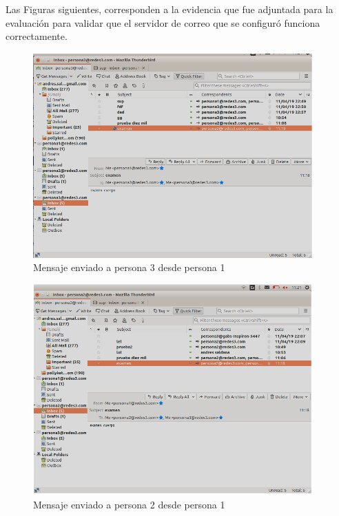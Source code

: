 \noindent
Las Figuras siguientes, corresponden a la evidencia que fue adjuntada para la evaluación para validar que el servidor de correo que se configuró funciona correctamente.

\begin{figure}[H]
    \centering
    \includegraphics[scale=1.20]{imagenes/primero/evidencia1_smtp.PNG}
    \caption{Mensaje enviado a persona 3 desde persona 1}
    \label{fig:smtp29}
\end{figure}

\begin{figure}[H]
    \centering
    \includegraphics[scale=1.20]{imagenes/primero/evidencia2_smtp.PNG}
    \caption{Mensaje enviado a persona 2 desde persona 1}
    \label{fig:smtp30}
\end{figure}


